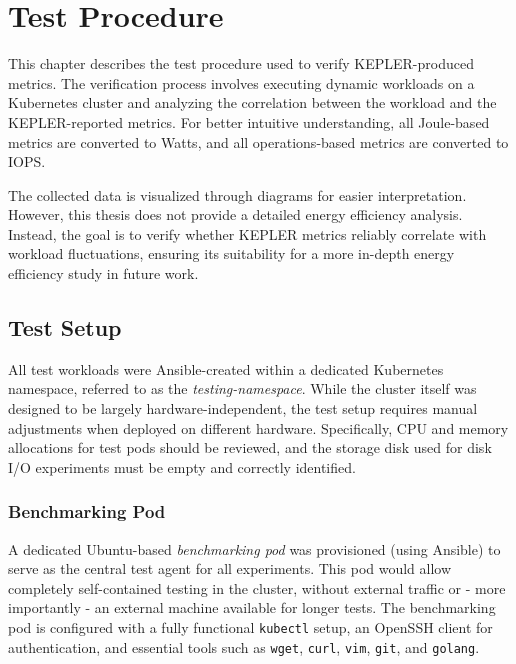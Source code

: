 
\chapter{Test Procedure} %
\label{Chapter4}

This chapter describes the test procedure used to verify KEPLER-produced metrics. The verification process involves executing dynamic workloads on a Kubernetes cluster and analyzing the correlation between the workload and the KEPLER-reported metrics. For better intuitive understanding, all Joule-based metrics are converted to Watts, and all operations-based metrics are converted to IOPS.

The collected data is visualized through diagrams for easier interpretation. However, this thesis does not provide a detailed energy efficiency analysis. Instead, the goal is to verify whether KEPLER metrics reliably correlate with workload fluctuations, ensuring its suitability for a more in-depth energy efficiency study in future work.

\section{Test Setup}
All test workloads were Ansible-created within a dedicated Kubernetes namespace, referred to as the \textit{testing-namespace}. While the cluster itself was designed to be largely hardware-independent, the test setup requires manual adjustments when deployed on different hardware. Specifically, CPU and memory allocations for test pods should be reviewed, and the storage disk used for disk I/O experiments must be empty and correctly identified.

\subsection{Benchmarking Pod}
A dedicated Ubuntu-based \textit{benchmarking pod} was provisioned (using Ansible) to serve as the central test agent for all experiments. This pod would allow completely self-contained testing in the cluster, without external traffic or - more importantly - an external machine available for longer tests. The benchmarking pod is configured with a fully functional \texttt{kubectl} setup, an OpenSSH client for authentication, and essential tools such as \texttt{wget}, \texttt{curl}, \texttt{vim}, \texttt{git}, and \texttt{golang}.

